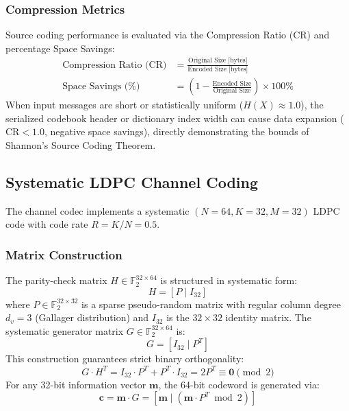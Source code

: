 \documentclass[conference]{IEEEtran}
\begin{document}
\subsubsection{Compression Metrics}
Source coding performance is evaluated via the Compression Ratio (CR) and percentage Space Savings:
\begin{align}
\text{Compression Ratio (CR)} &= \frac{\text{Original Size [bytes]}}{\text{Encoded Size [bytes]}} \\
\text{Space Savings (\%)} &= \left( 1 - \frac{\text{Encoded Size}}{\text{Original Size}} \right) \times 100\%
\end{align}
When input messages are short or statistically uniform ($H(X) \approx 1.0$), the serialized codebook header or dictionary index width can cause data expansion ($\text{CR} < 1.0$, negative space savings), directly demonstrating the bounds of Shannon's Source Coding Theorem.

\subsection{Systematic LDPC Channel Coding}
The channel codec implements a systematic $(N=64, K=32, M=32)$ LDPC code with code rate $R = K/N = 0.5$.

\subsubsection{Matrix Construction}
The parity-check matrix $H \in \mathbb{F}_2^{32 \times 64}$ is structured in systematic form:
\begin{equation}
H = [P \mid I_{32}]
\end{equation}
where $P \in \mathbb{F}_2^{32 \times 32}$ is a sparse pseudo-random matrix with regular column degree $d_v = 3$ (Gallager distribution) and $I_{32}$ is the $32 \times 32$ identity matrix. The systematic generator matrix $G \in \mathbb{F}_2^{32 \times 64}$ is:
\begin{equation}
G = [I_{32} \mid P^T]
\end{equation}
This construction guarantees strict binary orthogonality:
\begin{equation}
G \cdot H^T = I_{32} \cdot P^T + P^T \cdot I_{32} = 2 P^T \equiv \mathbf{0} \pmod 2
\end{equation}
For any 32-bit information vector $\mathbf{m}$, the 64-bit codeword is generated via:
\begin{equation}
\mathbf{c} = \mathbf{m} \cdot G = [\mathbf{m} \mid (\mathbf{m} \cdot P^T \bmod 2)]
\end{equation}
\end{document}

